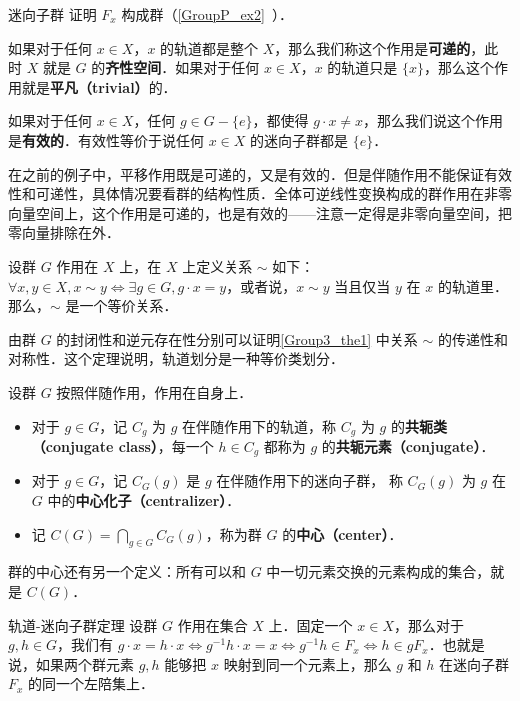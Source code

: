 \begin{exercise}{迷向子群}\label{Group3_exe1}
证明 $F_x$ 构成群（\autoref{GroupP_ex2}~）．
\end{exercise}

如果对于任何 $x\in X$，$x$ 的轨道都是整个 $X$，那么我们称这个作用是\textbf{可递的}，此时 $X$ 就是 $G$ 的\textbf{齐性空间}．如果对于任何 $x\in X$，$x$ 的轨道只是 $\{x\}$，那么这个作用就是\textbf{平凡（trivial）}的．

如果对于任何 $x\in X$，任何 $g\in G-\{e\}$，都使得 $g\cdot x\not=x$，那么我们说这个作用是\textbf{有效的}．有效性等价于说任何 $x\in X$ 的迷向子群都是 $\{e\}$．

在之前的例子中，平移作用既是可递的，又是有效的．但是伴随作用不能保证有效性和可递性，具体情况要看群的结构性质．全体可逆线性变换构成的群作用在非零向量空间上，这个作用是可递的，也是有效的——注意一定得是非零向量空间，把零向量排除在外．

\begin{theorem}{}\label{Group3_the1}
设群 $G$ 作用在 $X$ 上，在 $X$ 上定义关系 $\sim$ 如下：$\forall x, y\in X, x\sim y \iff \exists g\in G, g\cdot x=y$，或者说，$x\sim y$ 当且仅当 $y$ 在 $x$ 的轨道里．那么，$\sim$ 是一个等价关系．
\end{theorem}

由群 $G$ 的封闭性和逆元存在性分别可以证明\autoref{Group3_the1} 中关系 $\sim$ 的传递性和对称性．这个定理说明，轨道划分是一种等价类划分．

\begin{definition}{}
设群 $G$ 按照伴随作用，作用在自身上．
\begin{itemize}
\item 对于 $g\in G$，记 $C_g$ 为 $g$ 在伴随作用下的轨道，称 $C_g$ 为 $g$ 的\textbf{共轭类（conjugate class）}，每一个 $h\in C_g$ 都称为 $g$ 的\textbf{共轭元素（conjugate）}．

\item 对于 $g\in G$，记 $C_G(g)$ 是 $g$ 在伴随作用下的迷向子群， 称 $C_G(g)$ 为 $g$ 在 $G$ 中的\textbf{中心化子（centralizer）}．

\item 记 $C(G)=\bigcap_{g\in G} C_G(g)$，称为群 $G$ 的\textbf{中心（center）}．
\end{itemize}
\end{definition}

群的中心还有另一个定义：所有可以和 $G$ 中一切元素交换的元素构成的集合，就是 $C(G)$．

\begin{theorem}{轨道-迷向子群定理}\label{Group3_the2}
设群 $G$ 作用在集合 $X$ 上．固定一个 $x\in X$，那么对于 $g, h\in G$，我们有 $g\cdot x=h\cdot x\iff g^{-1}h\cdot x=x\iff g^{-1}h\in F_x\iff h\in gF_x$．也就是说，如果两个群元素 $g, h$ 能够把 $x$ 映射到同一个元素上，那么 $g$ 和 $h$ 在迷向子群 $F_x$ 的同一个左陪集上．
\end{theorem}

